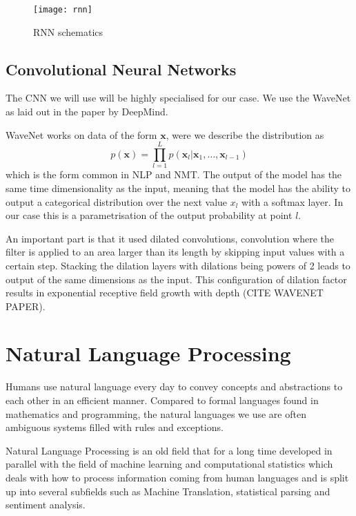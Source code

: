 \begin{figure}[h]
  \centering
  \texttt{[image: rnn]}
  \caption{RNN schematics}
  \label{fig:rolled_rnn}
\end{figure}

\subsection{Convolutional Neural Networks}

The CNN we will use will be highly specialised for our case. We use the WaveNet
as laid out in the paper by DeepMind.

WaveNet works on data of the form $\bm{x}$, were we describe the distribution as
\begin{equation*}
p(\bm{x}) = \prod_{l=1}^L p(\bm{x}_l| \bm{x}_1, \dots, \bm{x}_{l-1})
\end{equation*}
which is the form common in NLP and NMT. The output of the model has the same
time dimensionality as the input, meaning that the model has the ability to
output a categorical distribution over the next value $x_l$ with a softmax
layer. In our case this is a parametrisation of the output probability at point $l$.

An important part is that it used dilated convolutions, convolution where the filter
is applied to an area larger than its length by skipping input values with a certain
step. Stacking the dilation layers with dilations being powers of 2 leads to output
of the same dimensions as the input. This configuration of dilation factor results
in exponential receptive field growth with depth (CITE WAVENET PAPER).

\section{Natural Language Processing}

Humans use natural language every day to convey concepts and abstractions to each
other in an efficient manner. Compared to formal languages found in
mathematics and programming, the natural languages we use are often
ambiguous systems filled with rules and exceptions\cite{Rosenfeld00twodecades, sep-computational-linguistics}.

Natural Language Processing is an old field that for a long
time developed in parallel with the field of machine learning and
computational statistics which deals with how to process information coming from
human languages and is split up into several subfields such as Machine
Translation, statistical parsing and sentiment analysis\cite{sep-computational-linguistics}.

